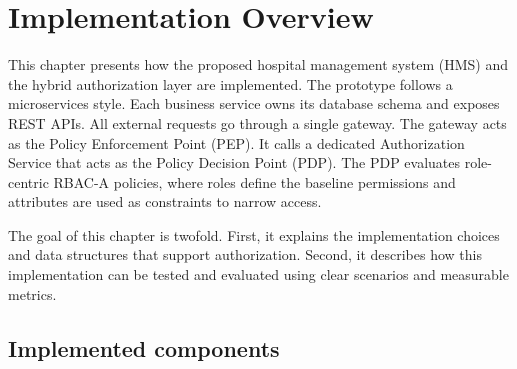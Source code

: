 \section{Implementation Overview}
This chapter presents how the proposed hospital management system (HMS) and the hybrid authorization layer are implemented. The prototype follows a microservices style. Each business service owns its database schema and exposes REST APIs. All external requests go through a single gateway. The gateway acts as the Policy Enforcement Point (PEP). It calls a dedicated Authorization Service that acts as the Policy Decision Point (PDP). The PDP evaluates role-centric RBAC-A policies, where roles define the baseline permissions and attributes are used as constraints to narrow access.
\vspace{0.5cm}

The goal of this chapter is twofold. First, it explains the implementation choices and data structures that support authorization. Second, it describes how this implementation can be tested and evaluated using clear scenarios and measurable metrics.

\subsection{Implemented components}

